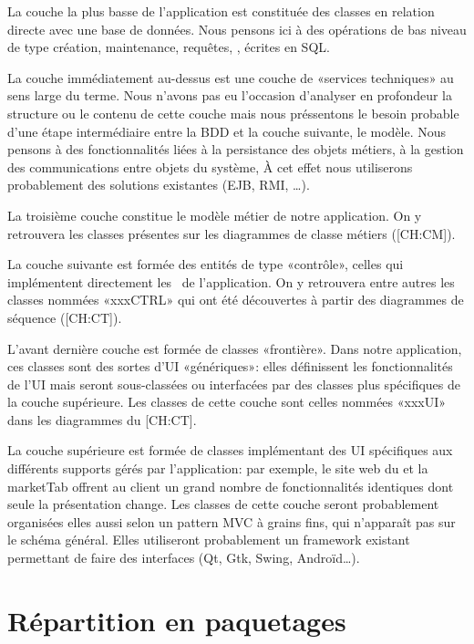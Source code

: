 \startitemize
\item La couche la plus basse de l'application est constituée des classes en relation directe avec une base de données. 
Nous pensons ici à des opérations de bas niveau de type création, maintenance, requêtes, \etc, écrites en SQL.
\item La couche immédiatement au-dessus est une couche de «services techniques» au sens large du terme.
Nous n'avons pas eu l'occasion d'analyser en profondeur la structure ou le contenu de cette couche mais nous préssentons le besoin probable d'une étape intermédiaire entre la BDD et la couche suivante, le modèle.
Nous pensons à des fonctionnalités liées à la persistance des objets métiers, à la gestion des communications entre objets du système, \etc 
À cet effet nous utiliserons probablement des solutions existantes (EJB, RMI, \dots).\par
\item La troisième couche constitue le modèle métier de notre application.
On y retrouvera les classes présentes sur les diagrammes de classe métiers ([CH:CM]).
\item La couche suivante est formée des entités de type «contrôle», \cad celles qui implémentent directement les \cu\ de l'application.
On y retrouvera entre autres les classes nommées «xxxCTRL» qui ont été découvertes à partir des diagrammes de séquence ([CH:CT]).
\item L'avant dernière couche est formée de classes «frontière». 
Dans notre application, ces classes sont des sortes d'UI «génériques»: elles définissent les fonctionnalités de l'UI mais seront sous-classées ou interfacées par des classes plus spécifiques de la couche supérieure.
Les classes de cette couche sont celles nommées «xxxUI» dans les diagrammes du [CH:CT].
\item La couche supérieure est formée de classes implémentant des UI spécifiques aux différents supports gérés par l'application: par exemple, le site web du \fm et la marketTab offrent au client un grand nombre de fonctionnalités identiques dont seule la présentation change.
Les classes de cette couche seront probablement organisées elles aussi selon un pattern MVC à grains fins, qui n'apparaît pas sur le schéma général.
Elles utiliseront probablement un framework existant permettant de faire des interfaces (Qt, Gtk, Swing, Androïd\dots).
\stopitemize


\section{Répartition en paquetages}

